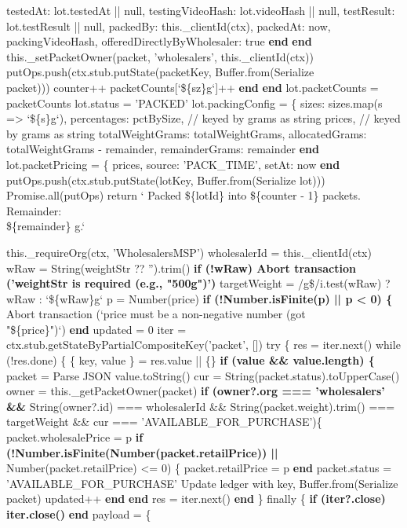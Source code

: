 \documentclass[12pt]{article}
\begin{document}
\begin{algorithm}[H]
\caption{packLotIntoPackets() (Part 4 of 4)}
testedAt: lot.testedAt || null,\;
testingVideoHash: lot.videoHash || null,\;
testResult: lot.testResult || null,\;
packedBy: this.\_clientId(ctx),\;
packedAt: now,\;
packingVideoHash,\;
offeredDirectlyByWholesaler: true\;
\textbf{end}\;
\textbf{end}\;
this.\_setPacketOwner(packet, 'wholesalers', this.\_clientId(ctx))\;
putOps.push(ctx.stub.putState(packetKey, Buffer.from(Serialize\\
\quad packet)))\;
counter++\;
packetCounts[`\$\{sz\}g`]++\;
\textbf{end}\;
\textbf{end}\;
lot.packetCounts = packetCounts\;
lot.status = 'PACKED'\;
lot.packingConfig = \{\;
sizes: sizes.map(s => `\$\{s\}g`),\;
percentages: pctBySize,     // keyed by grams as string\;
prices,                     // keyed by grams as string\;
totalWeightGrams: totalWeightGrams,\;
allocatedGrams: totalWeightGrams - remainder,\;
remainderGrams: remainder\;
\textbf{end}\;
lot.packetPricing = \{\;
prices,\;
source: 'PACK\_TIME',\;
setAt: now\;
\textbf{end}\;
putOps.push(ctx.stub.putState(lotKey, Buffer.from(Serialize lot)))\;
Promise.all(putOps)\;
return ` Packed \$\{lotId\} into \$\{counter - 1\} packets. Remainder:\\
\quad \$\{remainder\} g.`\;
\end{algorithm}


\begin{algorithm}[H]
\caption{setPacketPriceForWeight() (Part 1 of 2)}
this.\_requireOrg(ctx, 'WholesalersMSP')\;
wholesalerId = this.\_clientId(ctx)\;
wRaw = String(weightStr ?? '').trim()\;
\textbf{if (!wRaw) Abort transaction ('weightStr is required (e.g., "500g")')}\;
targetWeight = /g\$/i.test(wRaw) ? wRaw : `\$\{wRaw\}g`\;
p = Number(price)\;
\textbf{if (!Number.isFinite(p) || p < 0) \{}\;
Abort transaction (`price must be a non-negative number (got\\
\quad "\$\{price\}")`)\;
\textbf{end}\;
updated = 0\;
iter = ctx.stub.getStateByPartialCompositeKey('packet', [])\;
try \{\;
res = iter.next()\;
while (!res.done) \{\;
\{ key, value \} = res.value || \{\}\;
\textbf{if (value \&\& value.length) \{}\;
packet = Parse JSON value.toString()\;
cur = String(packet.status).toUpperCase()\;
owner = this.\_getPacketOwner(packet)\;
\textbf{if (owner?.org === 'wholesalers' \&\&}\;
String(owner?.id) === wholesalerId \&\&\;
String(packet.weight).trim() === targetWeight \&\&\;
cur === 'AVAILABLE\_FOR\_PURCHASE')\{\;
packet.wholesalePrice = p\;
\textbf{if (!Number.isFinite(Number(packet.retailPrice)) ||}\\
\quad Number(packet.retailPrice) <= 0) \{\;
packet.retailPrice = p\;
\textbf{end}\;
packet.status = 'AVAILABLE\_FOR\_PURCHASE'\;
Update ledger with key, Buffer.from(Serialize packet)\;
updated++\;
\textbf{end}\;
\textbf{end}\;
res = iter.next()\;
\textbf{end}\;
\} finally \{\;
\textbf{if (iter?.close) iter.close()}\;
\textbf{end}\;
payload = \{\;
\end{algorithm}
\end{document}
